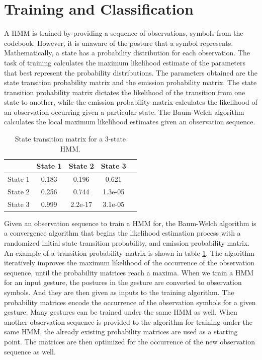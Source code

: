 \documentclass[]{report}   %
\begin{document}
\section{Training and Classification}
A HMM is trained by providing a sequence of observations, symbols from the codebook. However, it is unaware of the posture that a symbol represents. Mathematically, a state has a probability distribution for each observation. The task of training calculates the maximum likelihood estimate of the parameters that best represent the probability distributions\cite{1165342}. The parameters obtained are the state transition probability matrix and the emission probability matrix. The state transition probability matrix dictates the likelihood of the transition from one state to another, while the emission probability matrix calculates the likelihood of an observation occurring given a particular state. The Baum-Welch algorithm \cite{1165342} calculates the local maximum likelihood estimates given an observation sequence. 

\begin{table}[htbp]
	\centering
		\begin{tabular}{|l|c|c|c|c|}
		\hline
             & State 1 & State 2 & State 3 \\ \hline
        State 1 & 0.183     & 0.196    & 0.621    \\ \hline
        State 2  & 0.256     & 0.744    & 1.3e-05      \\ \hline
        State 3 & 0.999    & 2.2e-17    & 3.1e-05     \\ \hline
		\end{tabular}
	\caption{State transition matrix for a 3-state HMM.}
	\label{tab:hmm3state}
\end{table}

Given an observation sequence to train a HMM for, the Baum-Welch algorithm is a convergence algorithm that begins the likelihood estimation process with a randomized\cite{Stamp04arevealing} initial state transition probability, and emission probability matrix. An example of a transition probability matrix is shown in table \ref{tab:hmm3state}. The algorithm iteratively improves the maximum likelihood of the occurrence of the observation sequence, until the probability matrices reach a maxima. When we train a HMM for an input gesture, the postures in the gesture are converted to observation symbols. And they are then given as inputs to the training algorithm. The probability matrices encode the occurrence of the observation symbols for a given gesture\cite{Yang_1994_329}. Many gestures can be trained under the same HMM as well. When another observation sequence is provided to the algorithm for training under the same HMM, the already existing probability matrices are used as a starting point. The matrices are then optimized for the occurrence of the new observation sequence as well.
\end{document}
